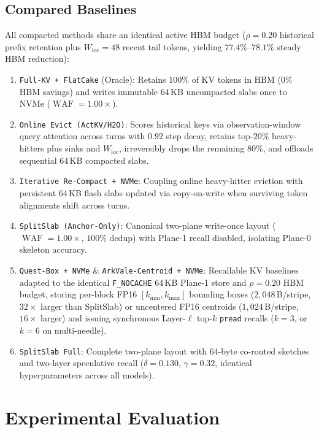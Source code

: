 \documentclass[10pt,journal,compsoc]{IEEEtran}
\theoremstyle{definition}
\theoremstyle{remark}
\newcommand{\SplitSlab}{\textup{\textsc{SplitSlab}}}
\newcommand{\WAF}{\operatorname{WAF}}
\def\SplitSlab{SplitSlab}%
\begin{document}
\subsection{Compared Baselines}
All compacted methods share an identical active HBM budget ($\rho = 0.20$ historical prefix retention plus $W_{\mathrm{loc}} = 48$ recent tail tokens, yielding $77.4\%$--$78.1\%$ steady HBM reduction):
\begin{enumerate}
  \item \texttt{Full-KV + FlatCake} (Oracle): Retains $100\%$ of KV tokens in HBM ($0\%$ HBM savings) and writes immutable $64$\,KB uncompacted slabs once to NVMe ($\WAF = 1.00\times$).
  \item \texttt{Online Evict (\texttt{ActKV}/\texttt{H2O})}: Scores historical keys via observation-window query attention across turns with $0.92$ step decay, retains top-$20\%$ heavy-hitters plus sinks and $W_{\mathrm{loc}}$, irreversibly drops the remaining $80\%$, and offloads sequential $64$\,KB compacted slabs.
  \item \texttt{Iterative Re-Compact + NVMe}: Coupling online heavy-hitter eviction with persistent $64$\,KB flash slabs updated via copy-on-write when surviving token alignments shift across turns.
  \item \texttt{\SplitSlab{} (Anchor-Only)}: Canonical two-plane write-once layout ($\WAF = 1.00\times$, $100\%$ dedup) with Plane-1 recall disabled, isolating Plane-0 skeleton accuracy.
  \item \texttt{Quest-Box + NVMe} \& \texttt{ArkVale-Centroid + NVMe}: Recallable KV baselines adapted to the identical \texttt{F\_NOCACHE} $64$\,KB Plane-1 store and $\rho{=}0.20$ HBM budget, storing per-block FP16 $[k_{\min}, k_{\max}]$ bounding boxes ($2{,}048$\,B/stripe, $32\times$ larger than \SplitSlab{}) or uncentered FP16 centroids ($1{,}024$\,B/stripe, $16\times$ larger) and issuing synchronous Layer-$\ell$ top-$k$ \texttt{pread} recalls ($k{=}3$, or $k{=}6$ on multi-needle).
  \item \texttt{\SplitSlab{} Full}: Complete two-plane layout with $64$-byte co-routed sketches and two-layer speculative recall ($\delta = 0.130$, $\gamma = 0.32$, identical hyperparameters across all models).
\end{enumerate}

\section{Experimental Evaluation}\label{sec:eval}
\end{document}
